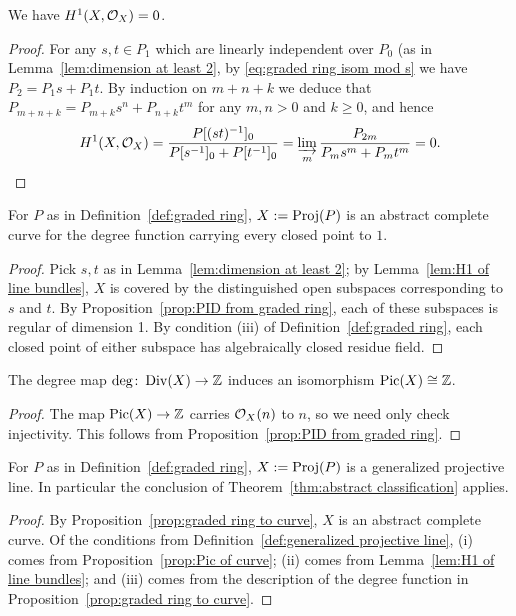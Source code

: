 \begin{lemma} \label{lem:H1 of line bundles}
We have $H^1(X, \mathcal{O}_X) = 0$.
\end{lemma}
\begin{proof}
For any $s,t \in P_1$ which are linearly independent over $P_0$
(as in Lemma~\ref{lem:dimension at least 2},
by \eqref{eq:graded ring isom mod s} we have $P_2 = P_1 s + P_1 t$.
By induction on $m+n+k$ we deduce that $P_{m+n+k} = P_{m+k} s^n + P_{n+k} t^m$ for any $m,n >0$ and $k \geq 0$, and hence
\[
H^1(X, \mathcal{O}_X) = \frac{P[(st)^{-1}]_0}{P[s^{-1}]_0 + P[t^{-1}]_0} = 
\varinjlim_m \frac{P_{2m}}{P_{m}s^m + P_{m} t^m} = 0. 
\qedhere
\]
\end{proof}

\begin{proposition} \label{prop:graded ring to curve}
For $P$ as in Definition~\ref{def:graded ring}, $X := \operatorname{Proj}(P)$ is an abstract complete curve
for the degree function carrying every closed point to $1$.
\end{proposition}
\begin{proof}
Pick $s,t$ as in Lemma~\ref{lem:dimension at least 2};
by Lemma~\ref{lem:H1 of line bundles},
$X$ is covered by the distinguished open subspaces corresponding to $s$ and $t$.
By Proposition~\ref{prop:PID from graded ring},  each of these subspaces is regular of dimension 1.
By condition (iii) of Definition~\ref{def:graded ring}, each closed point of either subspace has algebraically closed residue field.
\end{proof}

\begin{proposition} \label{prop:Pic of curve}
The degree map $\deg\colon \operatorname{Div}(X) \to \mathbb{Z}$ induces an isomorphism $\operatorname{Pic}(X) \cong \mathbb{Z}$.
\end{proposition}
\begin{proof}
The map $\operatorname{Pic}(X) \to \mathbb{Z}$ carries $\mathcal{O}_X(n)$ to $n$, so we need only check injectivity.
This follows from Proposition~\ref{prop:PID from graded ring}.
\end{proof}

\begin{theorem} \label{thm:graded ring projective line}
For $P$ as in Definition~\ref{def:graded ring}, $X := \operatorname{Proj}(P)$ is a generalized projective line.
In particular the conclusion of Theorem~\ref{thm:abstract classification} applies.
\end{theorem}
\begin{proof}
By Proposition~\ref{prop:graded ring to curve}, $X$ is an abstract complete curve.
Of the conditions from Definition~\ref{def:generalized projective line}, 
(i) comes from Proposition~\ref{prop:Pic of curve};
(ii) comes from Lemma~\ref{lem:H1 of line bundles}; and
(iii) comes from the description of the degree function in Proposition~\ref{prop:graded ring to curve}.
\end{proof}